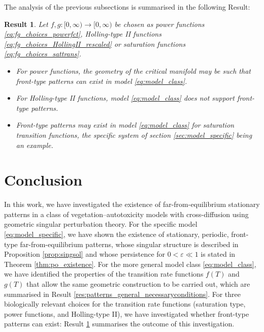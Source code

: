 \documentclass[a4paper,10pt,abstract=true,parskip=true]{scrartcl}
\newtheorem{res}[thm]{Result}
\theoremstyle{remark}
\numberwithin{equation}{section}
\numberwithin{thm}{section}
\begin{document}
The analysis of the previous subsections is summarised in the following Result:
\begin{res}\label{res:patterns_generalmodel}
    Let $f,g: [0,\infty) \to [0,\infty)$ be chosen as power functions \eqref{eq:fg_choices_powerfct}, Holling-type II functions \eqref{eq:fg_choices_HollingII_rescaled} or saturation functions \eqref{eq:fg_choices_sattrans}.
    \begin{itemize}
     \item For power functions, the geometry of the critical manifold may be such that front-type patterns can exist in model \eqref{eq:model_class}.
     \item For Holling-type II functions, model \eqref{eq:model_class} does not support front-type patterns.
     \item Front-type patterns may exist in model \eqref{eq:model_class} for saturation transition functions, the specific system of section \ref{sec:model_specific} being an example.
    \end{itemize}
\end{res}

\section{Conclusion}


In this work, we have investigated the existence of far-from-equilibrium stationary patterns in a class of vegetation--autotoxicity models with cross-diffusion using geometric singular perturbation theory. For the specific model \eqref{eq:model_specific}, we have shown the existence of stationary, periodic, front-type far-from-equilibrium patterns, whose singular structure is described in Proposition \ref{prop:singsol} and whose persistence for $0<\varepsilon \ll 1$ is stated in Theorem \ref{thm:po_existence}. For the more general model class \eqref{eq:model_class}, we have identified the properties of the transition rate functions $f(T)$ and $g(T)$ that allow the same geometric construction to be carried out, which are summarised in Result \ref{res:patterns_general_necessaryconditions}. For three biologically relevant choices for the transition rate functions (saturation type, power functions, and Holling-type II), we have investigated whether front-type patterns can exist: Result \ref{res:patterns_generalmodel} summarises the outcome of this investigation.
\end{document}
